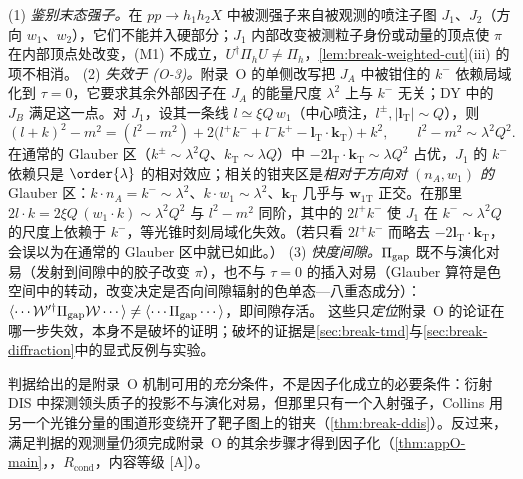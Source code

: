 \begin{remark}[失效的位置]\label{rem:break-measurement-failures}
(1) \emph{鉴别末态强子。}在 $pp\to h_1h_2X$ 中被测强子来自被观测的喷注子图 $J_1$、$J_2$（方向 $w_1$、$w_2$），它们不能并入硬部分；$J_1$ 内部改变被测粒子身份或动量的顶点使 $\pi$ 在内部顶点处改变，(M1) 不成立，$U^\dagger\Pi_hU\neq\Pi_h$，\cref{lem:break-weighted-cut}(iii) 的项不相消。
(2) \emph{失效于 (O-3)。}附录~O 的单侧改写把 $J_A$ 中被钳住的 $k^-$ 依赖局域化到 $\tau=0$，它要求其余外部因子在 $J_A$ 的能量尺度 $\lambda^2$ 上与 $k^-$ 无关；DY 中的 $J_B$ 满足这一点。对 $J_1$，设其一条线 $l\simeq\xi Q\,w_1$（中心喷注，$l^\pm,|\boldsymbol l_{\mathrm T}|\sim Q$），则
\begin{equation}\label{eq:break-J1-denominator}
(l+k)^2-m^2=(l^2-m^2)+2\big(l^+k^-+l^-k^+-\boldsymbol l_{\mathrm T}\cdot\boldsymbol k_{\mathrm T}\big)+k^2 ,\qquad l^2-m^2\sim\lambda^2Q^2 .
\end{equation}
在通常的 Glauber 区（$k^\pm\sim\lambda^2Q$、$k_{\mathrm T}\sim\lambda Q$）中 $-2\boldsymbol l_{\mathrm T}\cdot\boldsymbol k_{\mathrm T}\sim\lambda Q^2$ 占优，$J_1$ 的 $k^-$ 依赖只是 $\order{\lambda}$ 的相对效应；相关的钳夹区是\emph{相对于方向对 $(n_A,w_1)$ 的} Glauber 区：$k\cdot n_A=k^-\sim\lambda^2$、$k\cdot w_1\sim\lambda^2$、$\boldsymbol k_{\mathrm T}$ 几乎与 $\boldsymbol w_{1\mathrm T}$ 正交。在那里 $2l\cdot k=2\xi Q\,(w_1\cdot k)\sim\lambda^2Q^2$ 与 $l^2-m^2$ 同阶，其中的 $2l^+k^-$ 使 $J_1$ 在 $k^-\sim\lambda^2Q$ 的尺度上依赖于 $k^-$，等光锥时刻局域化失效。（若只看 $2l^+k^-$ 而略去 $-2\boldsymbol l_{\mathrm T}\cdot\boldsymbol k_{\mathrm T}$，会误以为在通常的 Glauber 区中就已如此。）
(3) \emph{快度间隙。}$\Pi_{\rm gap}$ 既不与演化对易（发射到间隙中的胶子改变 $\pi$），也不与 $\tau=0$ 的插入对易（Glauber 算符是色空间中的转动，改变决定是否向间隙辐射的色单态—八重态成分）：$\langle\cdots\mathcal W'^\dagger\Pi_{\rm gap}\mathcal W\cdots\rangle\neq\langle\cdots\Pi_{\rm gap}\cdots\rangle$，即间隙存活。
这些只\emph{定位}附录~O 的论证在哪一步失效，本身不是破坏的证明；破坏的证据是\cref{sec:break-tmd}与\cref{sec:break-diffraction}中的显式反例与实验。
\end{remark}

判据给出的是附录~O 机制可用的\emph{充分}条件，不是因子化成立的必要条件：衍射 DIS 中探测领头质子的投影不与演化对易，但那里只有一个入射强子，Collins 用另一个光锥分量的围道形变绕开了靶子图上的钳夹（\cref{thm:break-ddis}）。反过来，满足判据的观测量仍须完成附录~O 的其余步骤才得到因子化（\cref{thm:appO-main}，\tagR，$R_{\mathrm{cond}}$，内容等级 [A]）。
